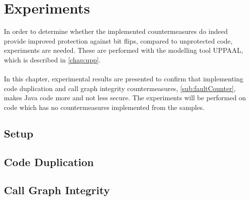\chapter{Experiments}
In order to determine whether the implemented countermeasures do indeed provide improved protection against bit flips, compared to unprotected code, experiments are needed. These are performed with the modelling tool UPPAAL, which is described in \cref{chap:upp}.\\\\
In this chapter, experimental results are presented to confirm that implementing code duplication and call graph integrity countermeasures, \cref{sub:faultCounter}, makes Java code more and not less secure. The experiments will be performed on code which has no countermeasures implemented from the \jc samples.
%
\section{Setup}

\section{Code Duplication}

\section{Call Graph Integrity}
